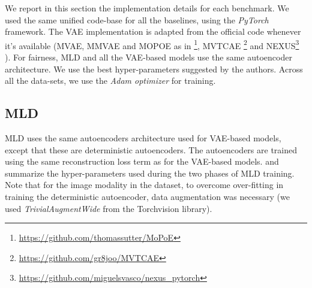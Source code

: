 
We report in this section the implementation details for each benchmark. We used the same unified code-base for all the baselines, using the \textit{PyTorch} framework. The \gls{VAE} implementation is adapted from the official code whenever it's available (\gls{MVAE}, \gls{MMVAE} and \gls{MOPOE} as in \footnote{\url{https://github.com/thomassutter/MoPoE}}, \gls{MVTCAE} \footnote{\url{https://github.com/gr8joo/MVTCAE}} and \gls{NEXUS}\footnote{\url{https://github.com/miguelsvasco/nexus_pytorch}} ). For fairness, \gls{MLD} and all the \gls{VAE}-based models use the same autoencoder architecture. We use the best hyper-parameters suggested by the authors. Across all the data-sets, we use the \textit{Adam optimizer} \cite{kingma2014adam} for training.

\subsection{MLD}
\gls{MLD} uses the same autoencoders architecture used for \gls{VAE}-based models, except that these are deterministic autoencoders. The autoencoders are trained using the same reconstruction loss term as for the \gls{VAE}-based models.  and  summarize the hyper-parameters used during the two phases of \gls{MLD} training.
Note that for the image modality in the \cub dataset, to overcome over-fitting in training the deterministic autoencoder, data augmentation was necessary (we used \textit{TrivialAugmentWide} from the Torchvision library). 

